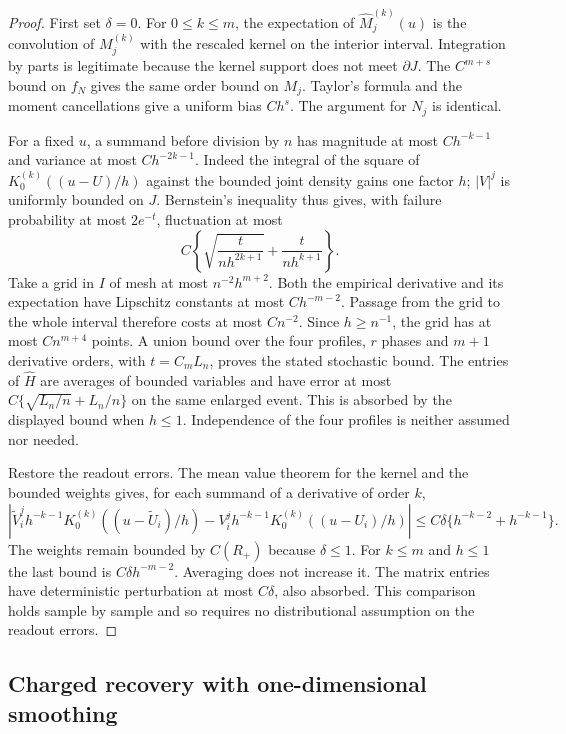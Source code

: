 \begin{proof}
First set $\delta=0$.  For $0\le k\le m$, the expectation of
$\widehat M_j^{(k)}(u)$ is the convolution of $M_j^{(k)}$ with the
rescaled kernel on the interior interval.  Integration by parts is
legitimate because the kernel support does not meet $\partial J$.
The $C^{m+s}$ bound on $f_N$ gives the same order bound on $M_j$.
Taylor's formula and the moment cancellations give a uniform bias
$Ch^s$.  The argument for $N_j$ is identical.

For a fixed $u$, a summand before division by $n$ has magnitude at
most $Ch^{-k-1}$ and variance at most $Ch^{-2k-1}$.  Indeed the
integral of the square of $K_0^{(k)}((u-U)/h)$ against the bounded
joint density gains one factor $h$; $|V|^j$ is uniformly bounded on
$J$.  Bernstein's inequality thus gives, with failure probability
at most $2e^{-t}$, fluctuation at most
\[
 C\left\{\sqrt{\frac{t}{nh^{2k+1}}}
                    +\frac{t}{nh^{k+1}}\right\}.
\]
Take a grid in $I$ of mesh at most $n^{-2}h^{m+2}$.  Both the
empirical derivative and its expectation have Lipschitz constants
at most $Ch^{-m-2}$.  Passage from the grid to the whole interval
therefore costs at most $Cn^{-2}$.  Since $h\ge n^{-1}$, the grid
has at most $C n^{m+4}$ points.  A union bound over the four profiles,
$r$ phases and $m+1$ derivative orders, with $t=C_m L_n$, proves
the stated stochastic bound.  The entries of $\widehat H$ are
averages of bounded variables and have error at most
$C\{\sqrt{L_n/n}+L_n/n\}$ on the same enlarged event.  This is
absorbed by the displayed bound when $h\le1$.  Independence of the
four profiles is neither assumed nor needed.

Restore the readout errors.  The mean value theorem for the kernel
and the bounded weights gives, for each summand of a derivative of
order $k$,
\[
 \left|\widetilde V_i^j h^{-k-1}
 K_0^{(k)}((u-\widetilde U_i)/h)
 -V_i^j h^{-k-1}K_0^{(k)}((u-U_i)/h)\right|
 \le C\delta\{h^{-k-2}+h^{-k-1}\}.
\]
The weights remain bounded by $C(R_+)$ because $\delta\le1$.
For $k\le m$ and $h\le1$ the last bound is
$C\delta h^{-m-2}$.  Averaging does not increase it.  The matrix
entries have deterministic perturbation at most $C\delta$, also
absorbed.  This comparison holds sample by sample and so requires
no distributional assumption on the readout errors.
\end{proof}

\subsection{Charged recovery with one-dimensional smoothing}

